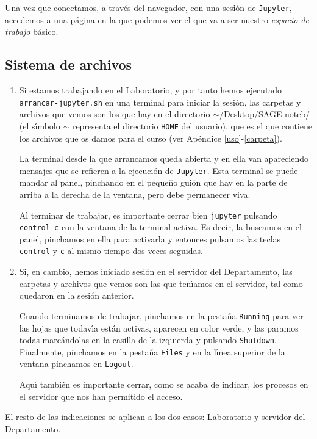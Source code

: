 Una vez que conectamos, a trav\'es del navegador, con una sesi\'on de {\tt Jupyter}, accedemos a una p\'agina  en la que podemos ver el que va a ser nuestro {\itshape espacio de trabajo} b\'asico.

\subsection{Sistema de archivos}\label{files}




\begin{enumerate}
	\item \label{files1}{\color{red}Si estamos trabajando en el Laboratorio}, y por tanto hemos ejecutado {\tt arrancar-jupyter.sh} en una terminal para iniciar la sesi\'on, las carpetas y archivos que vemos son los que hay en el directorio {$\sim$/Desktop/SAGE-noteb/} (el s\'{\i}mbolo $\sim$ representa el directorio {\tt HOME} del usuario), que es el que contiene  los archivos que os damos para el curso (ver Ap\'endice \ref{uso}-\ref{carpeta}).
	
	
	
	La terminal desde la que arrancamos  queda abierta y en ella van apareciendo mensajes que se refieren a la ejecuci\'on de {\tt Jupyter}. Esta terminal se puede mandar al panel, pinchando en el peque\~no gui\'on que hay en la parte de arriba a la derecha de la ventana, pero debe permanecer viva. 
	
	Al terminar de trabajar, es {\sc importante} cerrar bien {\tt jupyter} pulsando {\tt control-c} con la ventana de la terminal activa. Es decir, la buscamos en el panel, pinchamos en ella para activarla y entonces pulsamos las teclas {\tt control} y {\tt c} al mismo tiempo dos veces seguidas. 
	
	\item {\color{red} Si, en cambio, hemos iniciado sesi\'on en el servidor del Departamento}, las carpetas y archivos que vemos son las que ten\'{\i}amos en el servidor, tal como quedaron en la sesi\'on anterior.  
	
	Cuando terminamos de trabajar, pinchamos en la pesta\~na {\tt Running} para ver las hojas que todav\'{\i}a est\'an activas, aparecen en color verde, y las paramos todas marc\'andolas en la casilla de la izquierda y pulsando {\tt Shutdown}. Finalmente, pinchamos en la pesta\~na {\tt Files} y en la l\'{\i}nea superior de la ventana pinchamos en {\tt Logout}.
	
	Aqu\'{\i} tambi\'en es {\sc importante} cerrar,  como se acaba de indicar, los procesos en el servidor que nos han permitido el acceso. 
\label{cerrar}	
\end{enumerate}
El resto de las indicaciones se aplican a los dos casos: Laboratorio y servidor del Departamento.



